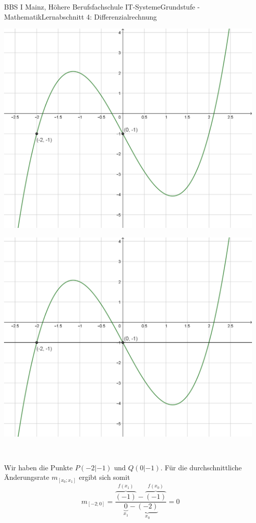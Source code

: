 \documentclass[11pt,twocolumn,oneside,openany,headings=optiontotoc,11pt,numbers=noenddot,final]{article}
\begin{document}
\begin{worksheet}{BBS I Mainz, Höhere Berufsfachschule IT-Systeme}{Grundstufe - Mathematik}{Lernabschnitt 4: Differenzialrechnung}
\begin{minipage}{0.2\textwidth}
			\includegraphics[width=0.98\textwidth,align=t]{../99_Bilder/04_Skr_DifQuo.png}
		\end{minipage}
		\hfill
		\begin{minipage}{0.2\textwidth}
			\includegraphics[width=0.98\textwidth,align=t]{../99_Bilder/04_Skr_DifQuo_G.png}
		\end{minipage}\\
		\par\noindent
		Wir haben die Punkte \(P(-2|-1)\) und \(Q(0|-1)\). Für die durchschnittliche Änderungsrate \(m_{[x_0;x_1]}\) ergibt sich somit
		\[m_{[-2;0]} = \frac{\overbrace{(-1)}^{f(x_1)} - \overbrace{(-1)}^{f(x_0)}}{\underbrace{0}_{x_1} - \underbrace{(-2)}_{x_0}} = 0\]

\end{worksheet}
\end{document}

